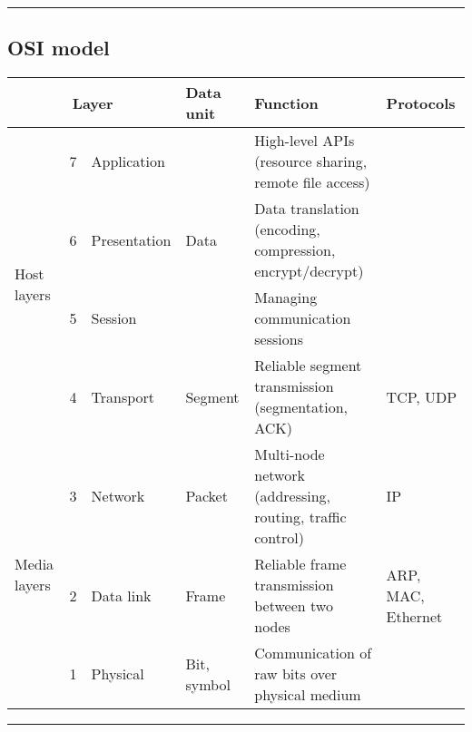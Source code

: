 \documentclass{form}
\begin{document}
\vspace{0.5em}\noindent\rule{\textwidth}{0.4pt}\vspace{-1em}
\subsection*{OSI model}
\begin{center}
    \begin{tabular}{p{9mm} | l | l | l | l | l}
        \multicolumn{3}{c|}{\textbf{Layer}}                    & Data unit                & Function                                                        & Protocols          \\ \hline
        \multirow{4}{9mm}{Host layers}      & 7 & Application  & \multirow{3}{*}{Data}    & High-level APIs (resource sharing, remote file access)          &                    \\ \cline{2-3} \cline{5-6}
                                            & 6 & Presentation &                          & Data translation (encoding, compression, encrypt/decrypt)       &                    \\ \cline{2-3} \cline{5-6}
                                            & 5 & Session      &                          & Managing communication sessions                                 &                    \\ \cline{2-6}
                                            & 4 & Transport    & Segment                  & Reliable segment transmission (segmentation, ACK)               & TCP, UDP           \\ \hline
        \multirow{3}{9mm}{Media layers}     & 3 & Network      & Packet                   & Multi-node network (addressing, routing, traffic control)       & IP                 \\ \cline{2-6}
                                            & 2 & Data link    & Frame                    & Reliable frame transmission between two nodes                   & ARP, MAC, Ethernet \\ \cline{2-6}
                                            & 1 & Physical     & Bit, symbol              & Communication of raw bits over physical medium                  &                    \\
    \end{tabular}
\end{center}

\vspace{-0.5em}\noindent\rule{\textwidth}{0.4pt}\vspace{0.5em}
\end{document}

